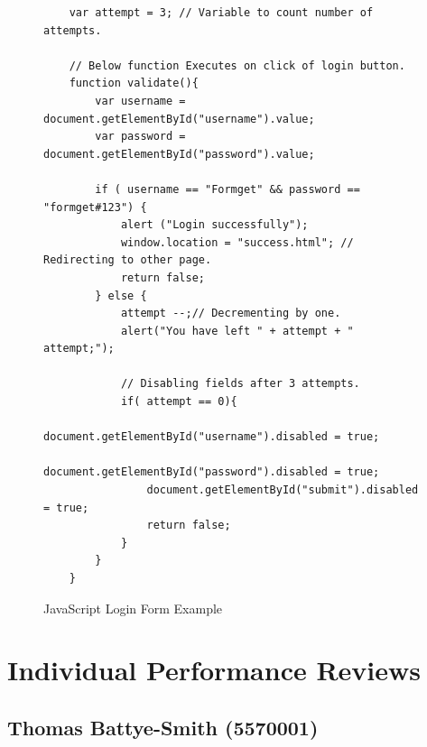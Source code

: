 \documentclass[12pt, a4paper]{article}
\begin{document}
            \begin{figure}[H]
                \begin{lstlisting}
    var attempt = 3; // Variable to count number of attempts.

    // Below function Executes on click of login button.
    function validate(){
        var username = document.getElementById("username").value;
        var password = document.getElementById("password").value;

        if ( username == "Formget" && password == "formget#123") {
            alert ("Login successfully");
            window.location = "success.html"; // Redirecting to other page.
            return false;
        } else {
            attempt --;// Decrementing by one.
            alert("You have left " + attempt + " attempt;");

            // Disabling fields after 3 attempts.
            if( attempt == 0){
                document.getElementById("username").disabled = true;
                document.getElementById("password").disabled = true;
                document.getElementById("submit").disabled = true;
                return false;
            }
        }
    }
                \end{lstlisting}
                \caption{JavaScript Login Form Example\cite{login_form}}
            \end{figure}
            \normalsize

        \newpage
        \section{Individual Performance Reviews}
            \subsection{Thomas Battye-Smith (5570001)}
\end{document}
